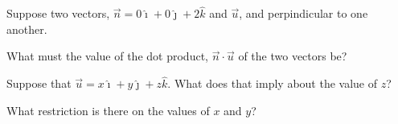 \begin{problem}
\item Suppose two vectors, $\vec{n}=0\hat{\imath}+0\hat{\jmath}+2\hat{k}$ and $\vec{u}$, and perpindicular to one another.
  \begin{subproblem}
    \item What must the value of the dot product, $\vec{n}\cdot\vec{u}$ of the two vectors be?
      \vfill
    \item Suppose that $\vec{u}=x\hat{\imath}+y\hat{\jmath}+z\hat{k}$.  What does that imply about the value of $z$?
      \vfill
    \item What restriction is there on the values of $x$ and $y$?
      \vfill
  \end{subproblem}
\end{problem}


